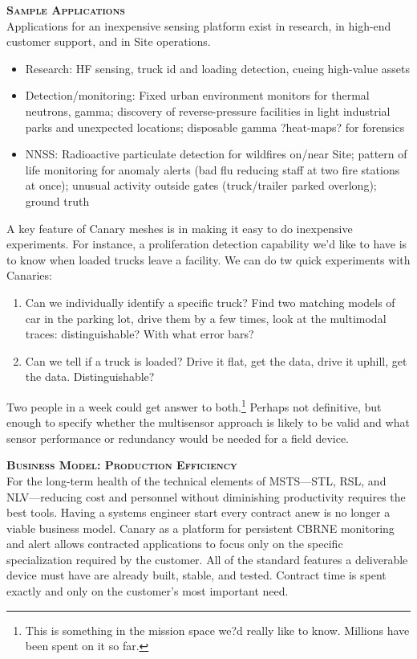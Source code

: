 \documentclass[11pt]{letter} %
\begin{document}
\textsc{\textbf {Sample Applications}}\\
Applications for an inexpensive sensing platform exist in research, in high-end customer support, and in Site operations.
\renewcommand\labelitemi{\tiny$\bullet$}
\begin{itemize}
\item Research: HF sensing, truck id and loading detection, cueing high-value assets
\item Detection/monitoring: Fixed urban environment monitors for thermal neutrons, gamma; discovery of reverse-pressure facilities in light industrial parks and unexpected locations; disposable gamma ?heat-maps? for forensics
\item NNSS: Radioactive particulate detection for wildfires on/near Site; pattern of life monitoring for anomaly alerts (bad flu reducing staff at two fire stations at once); unusual activity outside gates (truck/trailer parked overlong); ground truth
\end{itemize}

A key feature of Canary meshes is in making it easy to do inexpensive experiments. For instance, a proliferation detection capability we'd like to have is to know when loaded trucks leave a facility. We can do tw quick experiments with Canaries:
\begin{enumerate}
\item Can we individually identify a specific truck? Find two matching models of car in the parking lot, drive them by a few times, look at the multimodal traces: distinguishable? With what error bars? 
\item Can we tell if a truck is loaded? Drive it flat, get the data, drive it uphill, get the data. Distinguishable? 
\end{enumerate}
Two people in a week could get answer to both.\footnote{This is something in the mission space we?d really like to know. Millions have been spent on it so far.} Perhaps not definitive, but enough to specify whether the multisensor approach is likely to be valid and what sensor performance or redundancy would be needed for a field device. 

\vspace{20 pt}

\textsc{\textbf {Business Model: Production Efficiency}}\\
For the long-term health of the technical elements of MSTS---STL, RSL, and NLV---reducing cost and personnel without diminishing productivity requires the best tools. Having a systems engineer start every contract anew is no longer a viable business model. Canary as a platform for persistent CBRNE monitoring and alert allows contracted applications to focus only on the specific specialization required by the customer. All of the standard features a deliverable device must have are already built, stable, and tested. Contract time is spent exactly and only on the customer's most important need.
\end{document}
